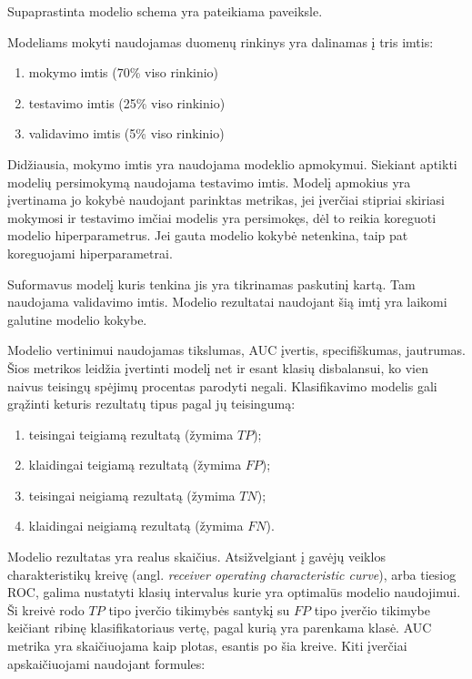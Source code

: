 
Supaprastinta modelio schema yra pateikiama  paveiksle.

Modeliams mokyti naudojamas duomenų rinkinys yra dalinamas į tris imtis:
\begin{enumerate}
    \item mokymo imtis (70\% viso rinkinio)
    \item testavimo imtis (25\% viso rinkinio)
    \item validavimo imtis (5\% viso rinkinio)
\end{enumerate}
Didžiausia, mokymo imtis yra naudojama modeklio apmokymui. Siekiant aptikti modelių persimokymą naudojama
testavimo imtis. Modelį apmokius yra įvertinama jo kokybė naudojant parinktas metrikas, jei įverčiai stipriai
skiriasi mokymosi ir testavimo imčiai modelis yra persimokęs, dėl to reikia koreguoti modelio hiperparametrus.
Jei gauta modelio kokybė netenkina,  taip pat koreguojami hiperparametrai.

Suformavus modelį kuris tenkina jis yra tikrinamas paskutinį kartą. Tam naudojama validavimo imtis.
Modelio rezultatai naudojant šią imtį yra laikomi galutine modelio kokybe.


Modelio vertinimui naudojamas tikslumas, AUC įvertis, specifiškumas, jautrumas. Šios metrikos leidžia
 įvertinti modelį net ir esant klasių disbalansui, ko vien naivus teisingų spėjimų procentas parodyti
  negali. Klasifikavimo modelis gali grąžinti keturis rezultatų tipus pagal jų teisingumą:
\begin{enumerate}
    \item teisingai teigiamą rezultatą (žymima $TP$);
    \item klaidingai teigiamą rezultatą (žymima $FP$);
    \item teisingai neigiamą rezultatą (žymima $TN$);
    \item klaidingai neigiamą rezultatą (žymima $FN$).
\end{enumerate}

 Modelio rezultatas yra realus skaičius. Atsižvelgiant į gavėjų veiklos charakteristikų kreivę
(angl. \textit{receiver operating characteristic curve}), arba tiesiog ROC, galima nustatyti
klasių intervalus kurie yra optimalūs modelio naudojimui. Ši kreivė rodo $TP$ tipo įverčio
tikimybės santykį su $FP$ tipo įverčio tikimybe keičiant ribinę klasifikatoriaus vertę, pagal
kurią yra parenkama klasė. AUC metrika yra skaičiuojama kaip plotas, esantis po šia kreive.
Kiti įverčiai apskaičiuojami naudojant formules:

